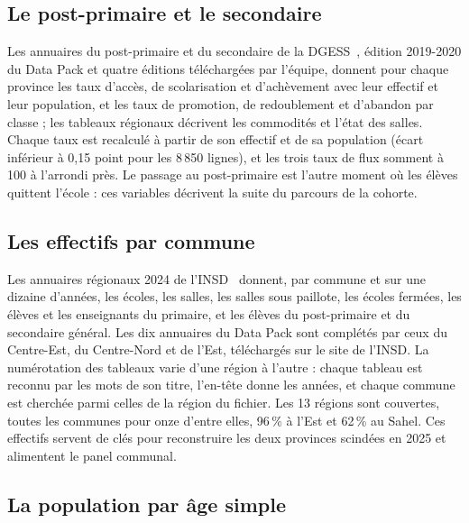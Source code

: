 \documentclass{article}
\begin{document}
\subsection{Le post-primaire et le secondaire}

Les annuaires du post-primaire et du secondaire de la DGESS~\cite{dgess_pps}, édition 2019-2020 du Data Pack et quatre éditions téléchargées par l'équipe, donnent pour chaque province les taux d'accès, de scolarisation et d'achèvement avec leur effectif et leur population, et les taux de promotion, de redoublement et d'abandon par classe ; les tableaux régionaux décrivent les commodités et l'état des salles. Chaque taux est recalculé à partir de son effectif et de sa population (écart inférieur à 0,15 point pour les 8\,850 lignes), et les trois taux de flux somment à 100 à l'arrondi près. Le passage au post-primaire est l'autre moment où les élèves quittent l'école : ces variables décrivent la suite du parcours de la cohorte.

\subsection{Les effectifs par commune}

Les annuaires régionaux 2024 de l'INSD~\cite{insd_annuaires} donnent, par commune et sur une dizaine d'années, les écoles, les salles, les salles sous paillote, les écoles fermées, les élèves et les enseignants du primaire, et les élèves du post-primaire et du secondaire général. Les dix annuaires du Data Pack sont complétés par ceux du Centre-Est, du Centre-Nord et de l'Est, téléchargés sur le site de l'INSD. La numérotation des tableaux varie d'une région à l'autre : chaque tableau est reconnu par les mots de son titre, l'en-tête donne les années, et chaque commune est cherchée parmi celles de la région du fichier. Les 13 régions sont couvertes, toutes les communes pour onze d'entre elles, 96\,\% à l'Est et 62\,\% au Sahel. Ces effectifs servent de clés pour reconstruire les deux provinces scindées en 2025 et alimentent le panel communal.

\subsection{La population par âge simple}
\label{sec:population}
\end{document}
